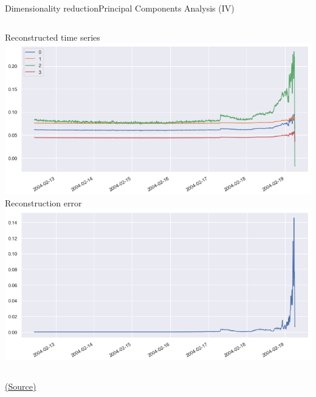 \documentclass[10pt,compress]{beamer} %
\begin{document}
\begin{frame}[plain]{Dimensionality reduction}{Principal Components Analysis (IV)}
    \begin{columns}
            Reconstructed time series
			\includegraphics[width=\linewidth]{figs/bearings2.png}
            Reconstruction error
			\includegraphics[width=\linewidth]{figs/bearingerror.png}
    \end{columns}

   	\centering \tiny{\href{https://www.atmosera.com/blog/pca-based-anomaly-detection/}{(Source)}}
\end{frame}
\end{document}
